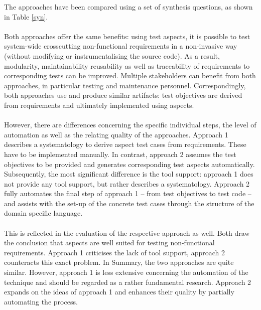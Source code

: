 The approaches have been compared using a set of synthesis questions, as shown in Table \ref{syn}.\\
\\
Both approaches offer the same benefits: using test aspects, it is possible to test system-wide crosscutting non-functional requirements in a non-invasive way (without modifying or instrumentalising the source code). As a result, modularity, maintainability reusability as well as traceability of requirements to corresponding tests can be improved. Multiple stakeholders can benefit from both approaches, in particular testing and maintenance personnel. Correspondingly, both approaches use and produce similar artifacts: test objectives are derived from requirements and ultimately implemented using aspects.\\
\\
However, there are differences concerning the specific individual steps, the level of automation as well as the relating quality of the approaches. Approach 1 describes a systematology to derive aspect test cases from requirements. These have to be implemented manually. In contrast, approach 2 assumes the test objectives to be provided and generates corresponding test aspects automatically. Subsequently, the most significant difference is the tool support: approach 1 does not provide any tool support, but rather describes a systematology. Approach 2 fully automates the final step of approach 1 – from test objectives to test code – and assists with the set-up of the concrete test cases through the structure of the domain specific language.\\ 
\\
This is reflected in the evaluation of the respective approach as well. Both draw the conclusion that aspects are well suited for testing non-functional requirements. Approach 1 criticises the lack of tool support, approach 2 counteracts this exact problem. In Summary, the two approaches are quite similar. However, approach 1 is less extensive concerning the automation of the technique and should be regarded as a rather fundamental research. Approach 2 expands on the ideas of approach 1 and enhances their quality by partially automating the process. 

